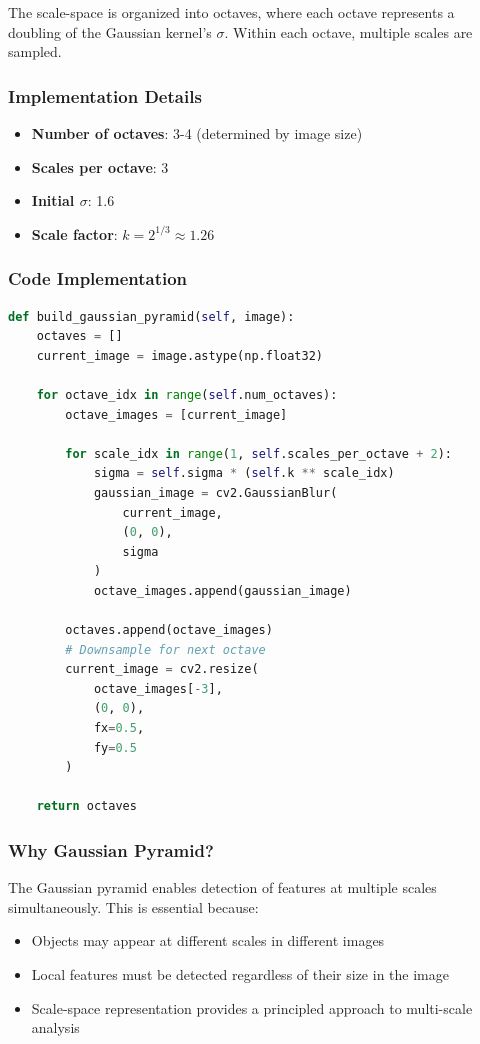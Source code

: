 \documentclass[12pt,a4paper]{article}
\begin{document}
The scale-space is organized into octaves, where each octave represents a doubling of the Gaussian kernel's $\sigma$. Within each octave, multiple scales are sampled.

\subsubsection{Implementation Details}
\begin{itemize}
    \item \textbf{Number of octaves}: 3-4 (determined by image size)
    \item \textbf{Scales per octave}: 3
    \item \textbf{Initial $\sigma$}: 1.6
    \item \textbf{Scale factor}: $k = 2^{1/3} \approx 1.26$
\end{itemize}

\subsubsection{Code Implementation}
\begin{lstlisting}[language=Python]
def build_gaussian_pyramid(self, image):
    octaves = []
    current_image = image.astype(np.float32)
    
    for octave_idx in range(self.num_octaves):
        octave_images = [current_image]
        
        for scale_idx in range(1, self.scales_per_octave + 2):
            sigma = self.sigma * (self.k ** scale_idx)
            gaussian_image = cv2.GaussianBlur(
                current_image, 
                (0, 0), 
                sigma
            )
            octave_images.append(gaussian_image)
        
        octaves.append(octave_images)
        # Downsample for next octave
        current_image = cv2.resize(
            octave_images[-3], 
            (0, 0), 
            fx=0.5, 
            fy=0.5
        )
    
    return octaves
\end{lstlisting}

\subsubsection{Why Gaussian Pyramid?}
The Gaussian pyramid enables detection of features at multiple scales simultaneously. This is essential because:
\begin{itemize}
    \item Objects may appear at different scales in different images
    \item Local features must be detected regardless of their size in the image
    \item Scale-space representation provides a principled approach to multi-scale analysis
\end{itemize}
\end{document}
